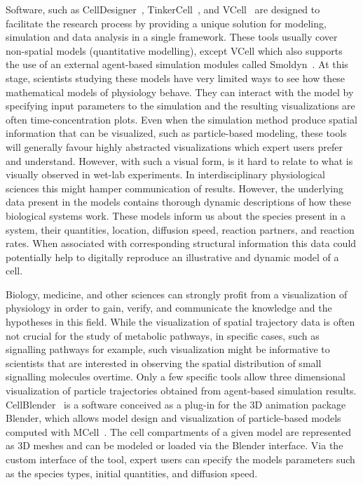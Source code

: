 Software, such as CellDesigner~\cite{funahashi2003celldesigner}, TinkerCell~\cite{chandran2009tinkercell}, and VCell~\cite{moraru2008virtual} are designed to facilitate the research process by providing a unique solution for modeling, simulation and data analysis in a single framework.
These tools usually cover non-spatial models (quantitative modelling), except VCell which also supports the use of an external agent-based simulation modules called Smoldyn~\cite{andrews2010detailed}.
At this stage, scientists studying these models have very limited ways to see how these mathematical models of physiology behave.
They can interact with the model by specifying input parameters to the simulation and the resulting visualizations are often time-concentration plots.
Even when the simulation method produce spatial information that can be visualized, such as particle-based modeling, these tools will generally favour highly abstracted visualizations which expert users prefer and understand.
However, with such a visual form, is it hard to relate to what is visually observed in wet-lab experiments. 
In interdisciplinary physiological sciences this might hamper communication of results. 
However, the underlying data present in the models contains thorough dynamic descriptions of how these biological systems work.
These models inform us about the species present in a system, their quantities, location, diffusion speed, reaction partners, and reaction rates.
When associated with corresponding structural information this data could potentially help to digitally reproduce an illustrative and dynamic model of a cell.

Biology, medicine, and other sciences can strongly profit from a visualization of physiology in order to gain, verify, and communicate the knowledge and the hypotheses in this field.
While the visualization of spatial trajectory data is often not crucial for the study of metabolic pathways, in specific cases, such as signalling pathways for example, such visualization might be informative to scientists that are interested in observing the spatial distribution of small signalling molecules overtime.
Only a few specific tools allow three dimensional visualization of particle trajectories obtained from agent-based simulation results.
CellBlender~\cite{cellblender} is a software conceived as a plug-in for the 3D animation package Blender, which allows model design and visualization of particle-based models computed with MCell~\cite{kerr2008fast}.
The cell compartments of a given model are represented as 3D meshes and can be modeled or loaded via the Blender interface.
Via the custom interface of the tool, expert users can specify the models parameters such as the species types, initial quantities, and diffusion speed.

